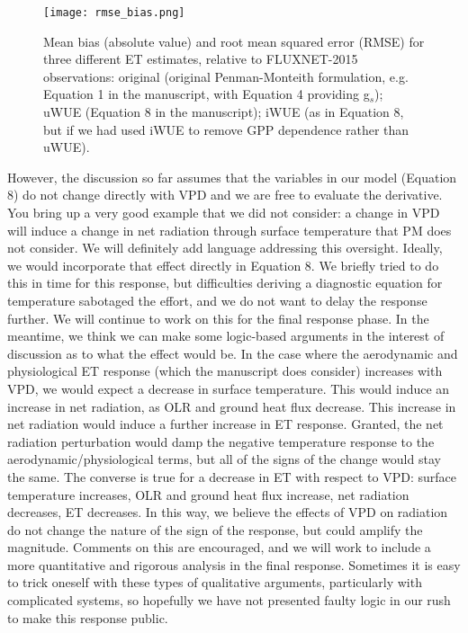 \documentclass[12pt]{article}
\begin{document}
\begin{figure}
  \centering \texttt{[image: rmse\_bias.png]}
  \caption{Mean bias (absolute value) and root mean squared error
    (RMSE) for three different ET estimates, relative to FLUXNET-2015
    observations: original (original Penman-Monteith formulation,
    e.g. Equation 1 in the manuscript, with Equation 4 providing
    g$_s$); uWUE (Equation 8 in the manuscript); iWUE (as in Equation
    8, but if we had used iWUE to remove GPP dependence rather than
    uWUE).}
  \label{rmse}
\end{figure}

However, the discussion so far assumes that the variables in our model
(Equation 8) do not change directly with VPD and we are free to
evaluate the derivative. You bring up a very good example that we did
not consider: a change in VPD will induce a change in net radiation
through surface temperature that PM does not consider. We will
definitely add language addressing this oversight. Ideally, we would
incorporate that effect directly in Equation 8. We briefly tried to do
this in time for this response, but difficulties deriving a diagnostic
equation for temperature sabotaged the effort, and we do not want to
delay the response further. We will continue to work on this for the
final response phase. In the meantime, we think we can make some
logic-based arguments in the interest of discussion as to what the
effect would be. In the case where the aerodynamic and physiological
ET response (which the manuscript does consider) increases with VPD,
we would expect a decrease in surface temperature. This would induce
an increase in net radiation, as OLR and ground heat flux
decrease. This increase in net radiation would induce a further
increase in ET response. Granted, the net radiation perturbation would
damp the negative temperature response to the
aerodynamic/physiological terms, but all of the signs of the change
would stay the same. The converse is true for a decrease in ET with
respect to VPD: surface temperature increases, OLR and ground heat
flux increase, net radiation decreases, ET decreases. In this way, we
believe the effects of VPD on radiation do not change the nature of
the sign of the response, but could amplify the magnitude. Comments on
this are encouraged, and we will work to include a more quantitative
and rigorous analysis in the final response. Sometimes it is easy to
trick oneself with these types of qualitative arguments, particularly
with complicated systems, so hopefully we have not presented faulty
logic in our rush to make this response public.
\end{document}
